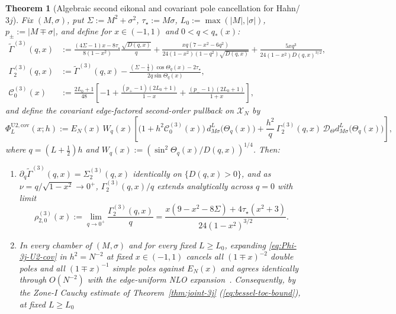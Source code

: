 \documentclass[11pt]{article}
\newtheorem{theorem}{Theorem}[section]
\theoremstyle{definition}
\theoremstyle{remark}
\newcommand{\cD}{\mathcal{D}}
\newcommand{\cC}{\mathcal{C}}
\newcommand{\cX}{\mathcal{X}}
\renewcommand{\_}{\oldunderscore\penalty0\hskip0pt\relax}
\begin{document}
\begin{theorem}[Algebraic second eikonal and covariant pole cancellation for Hahn/$3j$]
\label{thm:hahn-u2-cov}
Fix $(M,\sigma)$, put $\Sigma:=M^2+\sigma^2$, $\tau_\star:=M\sigma$, $L_0:=\max(|M|,|\sigma|)$, $p_\pm:=|M\mp\sigma|$, and define for $x\in(-1,1)$ and $0<q<q_*(x)$:
\begin{align}
  \widetilde{\Gamma}^{(3)}(q,x) &:= \frac{(4\Sigma-1)x-8\tau_\star}{8(1-x^2)}\frac{\sqrt{D(q,x)}}{q} +
    \frac{xq(7-x^2-6q^2)}{24(1-x^2)(1-q^2)\sqrt{D(q,x)}} + \frac{5xq^3}{24(1-x^2)D(q,x)^{3/2}}, \label{eq:tilde-Gamma-3}\\
  \Gamma_2^{(3)}(q,x) &:= \widetilde{\Gamma}^{(3)}(q,x) - \frac{(\Sigma-\tfrac14)\cos\Theta_q(x)-2\tau_\star}{2q\sin\Theta_q(x)}, \label{eq:Gamma2-3}\\
  \cC_0^{(3)}(x) &:= \frac{2L_0+1}{48}\left[-1 + \frac{(p_+-1)(2L_0+1)}{1-x} + \frac{(p_--1)(2L_0+1)}{1+x}\right], \label{eq:C0-3}
\end{align}
and define the covariant edge-factored second-order pullback on $\cX_N$ by
\begin{equation}
  \boxed{\Phi_L^{\mathrm{U2,cov}}(x;h) :=
    E_N(x)\,W_q(x)\left[\bigl(1+h^2\cC_0^{(3)}(x)\bigr)\,d^L_{M\sigma}\bigl(\Theta_q(x)\bigr) +
    \frac{h^2}{q}\,\Gamma_2^{(3)}(q,x)\,\cD_\Theta d^L_{M\sigma}\bigl(\Theta_q(x)\bigr)\right],}
  \label{eq:Phi-3j-U2-cov}
\end{equation}
where $q=(L+\frac12)h$ and $W_q(x):=(\sin^2\Theta_q(x)/D(q,x))^{1/4}$. Then:
\begin{enumerate}[label=(\alph*),leftmargin=2em,itemsep=2pt]
\item $\partial_q\widetilde{\Gamma}^{(3)}(q,x)=\Sigma_2^{(3)}(q,x)$ identically on $\{D(q,x)>0\}$, and as $\nu=q/\sqrt{1-x^2}\to
  0^+$, $\Gamma_2^{(3)}(q,x)/q$ extends analytically across $q=0$ with limit
\begin{equation}
  \rho_{2,0}^{(3)}(x) := \lim_{q\to 0^+}\frac{\Gamma_2^{(3)}(q,x)}{q} = \frac{x(9-x^2-8\Sigma)+4\tau_\star(x^2+3)}{24(1-x^2)^{3/2}}.
  \label{eq:rho20-3}
\end{equation}
\item In every chamber of $(M,\sigma)$ and for every fixed $L\ge L_0$, expanding \eqref{eq:Phi-3j-U2-cov} in $h^2=N^{-2}$ at
  fixed $x\in(-1,1)$ cancels all $(1\mp x)^{-2}$ double poles and all $(1\mp x)^{-1}$ simple poles against $E_N(x)$ and agrees
  identically through $O(N^{-2})$ with the edge-uniform NLO expansion~\cite[Corollary~10.3, Eq.~(261)]{LewisFixedRank}.
  Consequently, by the Zone-I Cauchy estimate of Theorem~\ref{thm:joint-3j} (\eqref{eq:bessel-toe-bound}), at fixed $L\ge L_0$

\end{enumerate}
\end{theorem}
\end{document}
